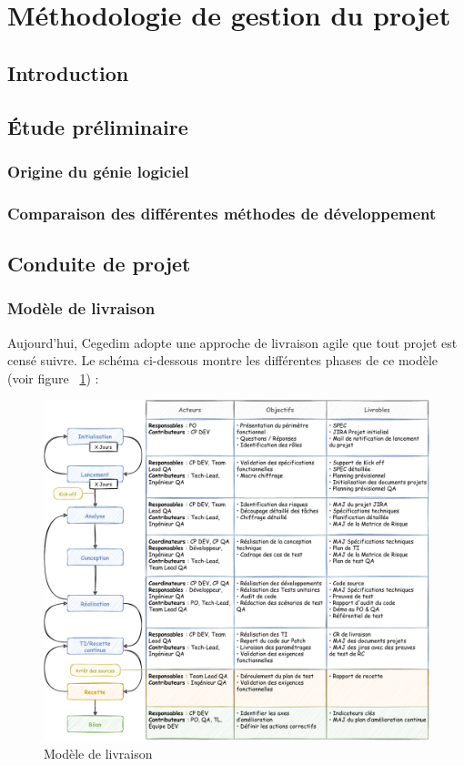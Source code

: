 \section{Méthodologie de gestion du projet}
\subsection{Introduction}
\subsection{Étude préliminaire}
\subsubsection{Origine du génie logiciel}
\subsubsection{Comparaison des différentes méthodes de développement}
\subsection{Conduite de projet}
\subsubsection{Modèle de livraison}
Aujourd'hui, Cegedim adopte une approche de livraison agile que tout projet est censé suivre. Le schéma ci-dessous montre les différentes phases de ce modèle (voir figure  ~\ref{fig:delivery}) :
\begin{figure}[H]
    \begin{center}
        \includegraphics[width=\linewidth]{images/sec3/deliveryprocess.pdf}
        \caption{Modèle de livraison}
        \label{fig:delivery}
    \end{center}
\end{figure}
\newpage

